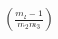 \documentclass[preview]{standalone}
\begin{document}
\begin{align*}
\left(\frac{m_2 - 1}{m_2 m_3}\right)
\end{align*}
\end{document}
